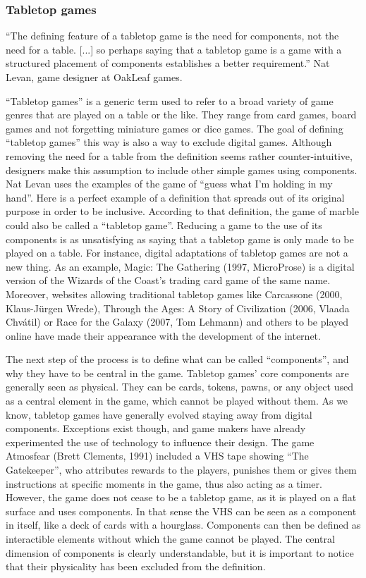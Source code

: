 \subsubsection{Tabletop games}

“The defining feature of a tabletop game is the need for components, not the need for a table. [...] so perhaps saying that a tabletop game is a game with a structured placement of components establishes a better requirement.” Nat Levan, game designer at OakLeaf games.

“Tabletop games” is a generic term used to refer to a broad variety of game genres that are played on a table or the like. They range from card games, board games and not forgetting miniature games or dice games. The goal of defining “tabletop games” this way is also a way to exclude digital games. Although removing the need for a table from the definition seems rather counter-intuitive, designers make this assumption to include other simple games using components. Nat Levan uses the examples of the game of “guess what I’m holding in my hand”. Here is a perfect example of a definition that spreads out of its original purpose in order to be inclusive. According to that definition, the game of marble could also be called a “tabletop game”. Reducing a game to the use of its components is as unsatisfying as saying that a tabletop game is only made to be played on a table. For instance, digital adaptations of tabletop games are not a new thing. As an example, Magic: The Gathering (1997, MicroProse) is a digital version of the Wizards of the Coast’s trading card game of the same name. Moreover, websites allowing traditional tabletop games like Carcassone (2000, Klaus-Jürgen Wrede), Through the Ages: A Story of Civilization (2006, Vlaada Chvátil) or Race for the Galaxy (2007, Tom Lehmann) and others to be played online have made their appearance with the development of the internet. 

The next step of the process is to define what can be called “components”, and why they have to be central in the game. Tabletop games’ core components are generally seen as physical. They can be cards, tokens, pawns, or any object used as a central element in the game, which cannot be played without them.  As we know, tabletop games have generally evolved staying away from digital components. Exceptions exist though, and game makers have already experimented the use of technology to influence their design. The game Atmosfear (Brett Clements, 1991) included a VHS tape showing “The Gatekeeper”, who attributes rewards to the players, punishes them or gives them instructions at specific moments in the game, thus also acting as a timer. However, the game does not cease to be a tabletop game, as it is played on a flat surface and uses components. In that sense the VHS can be seen as a component in itself, like a deck of cards with a hourglass. 
Components can then be defined as interactible elements without which the game cannot be played. The central dimension of components is clearly understandable, but it is important to notice that their physicality has been excluded from the definition.

